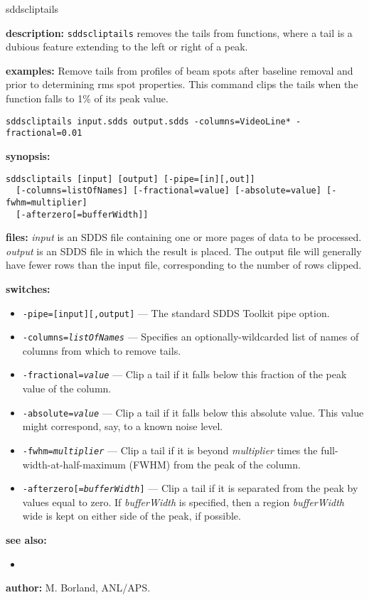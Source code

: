 \begin{sddsprog}{sddscliptails}
  \item {\bf description:}
  \verb|sddscliptails| removes the tails from functions, where a tail is a dubious feature
  extending to the left or right of a peak.
  \item {\bf examples:}
  Remove tails from profiles of beam spots after baseline removal and prior to determining
  rms spot properties. This command clips the tails when the function falls to 1\% of
  its peak value.
  \begin{verbatim}
sddscliptails input.sdds output.sdds -columns=VideoLine* -fractional=0.01
  \end{verbatim}
  \item {\bf synopsis:}
  \begin{verbatim}
sddscliptails [input] [output] [-pipe=[in][,out]]
  [-columns=listOfNames] [-fractional=value] [-absolute=value] [-fwhm=multiplier]
  [-afterzero[=bufferWidth]]
  \end{verbatim}
  \item {\bf files:}
  {\em input} is an SDDS file containing one or more pages of data to be processed.
  {\em output} is an SDDS file in which the result is placed. The output file will
  generally have fewer rows than the input file, corresponding to the number of
  rows clipped.
  \item {\bf switches:}
    \begin{itemize}
    \item {\tt -pipe=[input][,output]} --- The standard SDDS Toolkit pipe option.
    \item {\tt -columns={\em listOfNames}} --- Specifies an optionally-wildcarded list
      of names of columns from which to remove tails.
    \item {\tt -fractional={\em value}} --- Clip a tail if it falls below this fraction of the peak
      value of the column.
    \item {\tt -absolute={\em value}} --- Clip a tail if it falls below this absolute value. This
      value might correspond, say, to a known noise level.
    \item {\tt -fwhm={\em multiplier}} --- Clip a tail if it is beyond {\em multiplier} times
      the full-width-at-half-maximum (FWHM) from the peak of the column.
    \item {\tt -afterzero[={\em bufferWidth}]} --- Clip a tail if it is separated from the
      peak by values equal to zero.
      If {\em bufferWidth} is specified, then a region {\em bufferWidth} wide is kept
      on either side of the peak, if possible.
    \end{itemize}
  \item {\bf see also:}
    \begin{itemize}
    \item {}
    \end{itemize}
  \item {\bf author:} M. Borland, ANL/APS.
\end{sddsprog}

